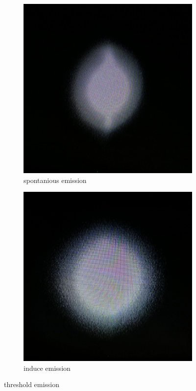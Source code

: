 \begin{figure}[h]
		\centering
		\begin{subfigure}[b]{0.45\textwidth}
				\begin{center}
						\includegraphics[width=0.9\linewidth]{./content/pictures/below_threshold.jpg}
						\caption{spontanious emission}
				\label{fig:spontanious}
				\end{center}
		\end{subfigure}
		\begin{subfigure}[b]{0.45\textwidth}
				\begin{center}
						\includegraphics[width=0.9\linewidth]{./content/pictures/above_threshold.jpg}
						\caption{induce emission}
						\label{fig:induce}
				\end{center}
		\end{subfigure}
		\caption{threshold emission}
\end{figure}


